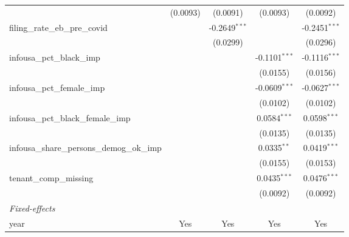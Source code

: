 \begin{tabular}{lcccc}
                                                                     & (0.0093)       & (0.0091)        & (0.0093)        & (0.0092)\\   
   filing\_rate\_eb\_pre\_covid                                      &                & -0.2649$^{***}$ &                 & -0.2451$^{***}$\\   
                                                                     &                & (0.0299)        &                 & (0.0296)\\   
   infousa\_pct\_black\_imp                                          &                &                 & -0.1101$^{***}$ & -0.1116$^{***}$\\   
                                                                     &                &                 & (0.0155)        & (0.0156)\\   
   infousa\_pct\_female\_imp                                         &                &                 & -0.0609$^{***}$ & -0.0627$^{***}$\\   
                                                                     &                &                 & (0.0102)        & (0.0102)\\   
   infousa\_pct\_black\_female\_imp                                  &                &                 & 0.0584$^{***}$  & 0.0598$^{***}$\\   
                                                                     &                &                 & (0.0135)        & (0.0135)\\   
   infousa\_share\_persons\_demog\_ok\_imp                           &                &                 & 0.0335$^{**}$   & 0.0419$^{***}$\\   
                                                                     &                &                 & (0.0155)        & (0.0153)\\   
   tenant\_comp\_missing                                             &                &                 & 0.0435$^{***}$  & 0.0476$^{***}$\\   
                                                                     &                &                 & (0.0092)        & (0.0092)\\   
   \midrule
   \emph{Fixed-effects}\\
   year                                                              & Yes            & Yes             & Yes             & Yes\\  

\end{tabular}
